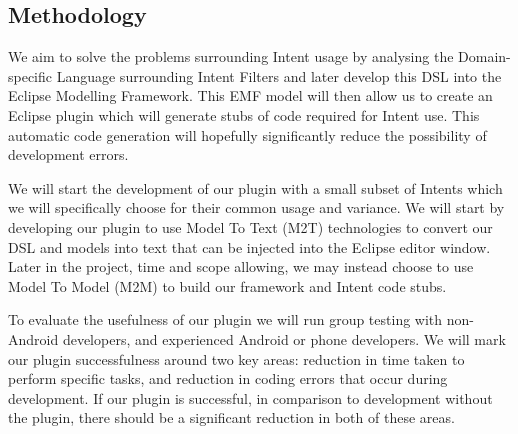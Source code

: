 \subsection{Methodology}
We aim to solve the problems surrounding Intent usage by analysing the Domain-specific Language surrounding Intent Filters and later develop this DSL into the Eclipse Modelling Framework. This EMF model will then allow us to create an Eclipse plugin which will generate stubs of code required for Intent use. This automatic code generation will hopefully significantly reduce the possibility of development errors.

We will start the development of our plugin with a small subset of Intents which we will specifically choose for their common usage and variance. We will start by developing our plugin to use Model To Text (M2T) technologies to convert our DSL and models into text that can be injected into the Eclipse editor window. Later in the project, time and scope allowing, we may instead choose to use Model To Model (M2M) to build  our framework and Intent code stubs.

To evaluate the usefulness of our plugin we will run group testing with non-Android developers, and experienced Android or phone developers. We will mark our plugin successfulness around two key areas: reduction in time taken to perform specific tasks, and reduction in coding errors that occur during development. If our plugin is successful, in comparison to development without the plugin, there should be a significant reduction in both of these areas.